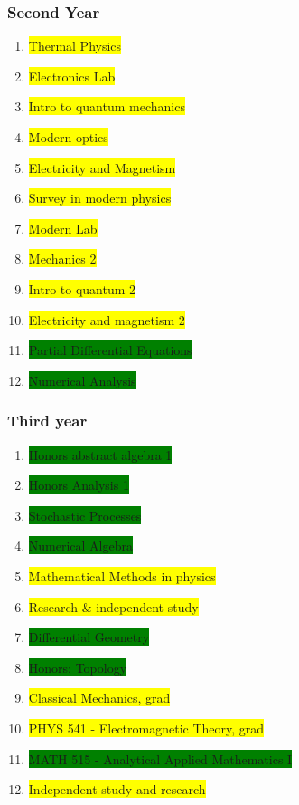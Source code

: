 \subsubsection{Second Year}
\begin{enumerate}
    \item \colorbox{yellow}{Thermal Physics}
    \item \colorbox{yellow}{Electronics Lab}
    \item \colorbox{yellow}{Intro to quantum mechanics}
    \item \colorbox{yellow}{Modern optics}
    \item \colorbox{yellow}{Electricity and Magnetism}
    \item \colorbox{yellow}{Survey in modern physics}
    \item \colorbox{yellow}{Modern Lab}
    \item \colorbox{yellow}{Mechanics 2}
    \item \colorbox{yellow}{Intro to quantum 2}
    \item \colorbox{yellow}{Electricity and magnetism 2}
    \item \colorbox{green}{Partial Differential Equations}
    \item \colorbox{green}{Numerical Analysis}
    
\end{enumerate}
\subsubsection{Third year}
\begin{enumerate}
    \item \colorbox{green}{Honors abstract algebra 1}
    \item \colorbox{green}{Honors Analysis 1}
    \item \colorbox{green}{Stochastic Processes}
    \item \colorbox{green}{Numerical Algebra}
    \item \colorbox{yellow}{Mathematical Methods in physics}
    \item \colorbox{yellow}{Research \& independent study}
    \item \colorbox{green}{Differential Geometry}
    \item \colorbox{green}{Honors: Topology}
    \item \colorbox{yellow}{Classical Mechanics, grad}
    \item \colorbox{yellow}{PHYS 541 - Electromagnetic Theory, grad}
    \item \colorbox{green}{MATH 515 - Analytical Applied Mathematics I}
    \item \colorbox{yellow}{Independent study and research}
\end{enumerate}
